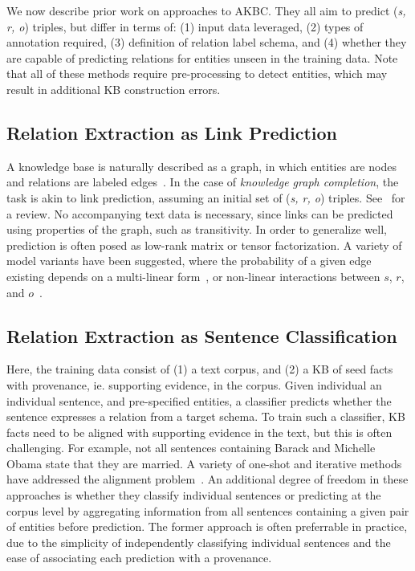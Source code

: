 We now describe prior work on approaches to AKBC. They all aim to predict (\emph{s, r, o}) triples, but differ in terms of: (1) input data leveraged, (2) types of annotation required, (3) definition of relation label schema, and (4) whether they are capable of predicting relations for entities unseen in the training data. Note that all of these methods require pre-processing to detect entities, which may result in additional KB construction errors.

\subsection{Relation Extraction as Link Prediction \label{sec:prediction}}
A knowledge base is naturally described as a graph, in which entities are nodes and relations are labeled edges~\citep{yago,freebase}. In the case of \emph{knowledge graph completion}, the task is akin to link prediction, assuming an initial set of (\emph{s, r, o}) triples. See~\citet{nickel2015review} for a review. No accompanying text data is necessary, since links can be predicted using properties of the graph, such as transitivity. In order to generalize well, prediction is often posed as low-rank matrix or tensor factorization. A variety of model variants have been suggested, where the probability of a given edge existing depends on a multi-linear form~\citep{rescal,DBLP:journals/corr/Garcia-DuranBUG15,bishan,transe,wang2014knowledge,lin2015learning}, or non-linear interactions between $s$, $r$, and $o$~\citep{socherkb}.

\subsection{Relation Extraction as Sentence Classification}
\label{seq:dist}

Here, the training data consist of (1) a text corpus, and (2) a KB of seed facts with provenance, ie. supporting evidence, in the corpus. Given individual an individual sentence, and pre-specified entities, a classifier predicts whether the sentence expresses a relation from a target schema. To train such a classifier, KB facts need to be aligned with supporting evidence in the text, but this is often challenging. For example, not all sentences containing Barack and Michelle Obama state that they are married. A variety of one-shot and iterative methods have addressed the alignment problem~\citep{bunescu2007learning,distant_supervision,riedel2010modeling,yao2010collective,hoffmann2011knowledge,surdeanu2012multi,min2013distant,zengdistant}.
An additional degree of freedom in these approaches is whether they classify individual sentences or predicting at the corpus level by aggregating information from all sentences containing a given pair of entities before prediction. The former approach is often preferrable in practice, due to the simplicity of independently classifying individual sentences and the ease of associating each prediction with a provenance.

